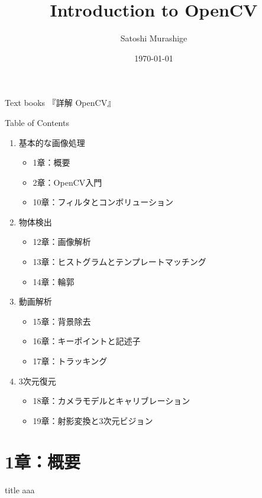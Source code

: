 \documentclass[10pt]{beamer}
\title{Introduction to OpenCV}
\date{\today}
\author{Satoshi Murashige}
\institute{Mathematical Informatics Lab., NAIST}
\newcommand{\myinsertlogo}[1]{%
\begin{tikzpicture}[overlay, remember picture]
    \node[above left=1cm and .8cm of current page.south east] {\texttt{[image: \#1]}};
\end{tikzpicture}}
\begin{document}
	\begin{frame}[plain]
		\maketitle
	\end{frame}
	\begin{frame}{Text books}
		『詳解 OpenCV』
	\end{frame}
	\begin{frame}{Table of Contents}
		\begin{enumerate}
			\item 基本的な画像処理
				\begin{itemize}
					\item 1章：概要
					\item 2章：OpenCV入門
					\item 10章：フィルタとコンボリューション
				\end{itemize}
			\item 物体検出
				\begin{itemize}
					\item 12章：画像解析
					\item 13章：ヒストグラムとテンプレートマッチング
					\item 14章：輪郭
				\end{itemize}
			\item 動画解析
				\begin{itemize}
					\item 15章：背景除去
					\item 16章：キーポイントと記述子
					\item 17章：トラッキング
				\end{itemize}
			\item 3次元復元
				\begin{itemize}
					\item 18章：カメラモデルとキャリブレーション
					\item 19章：射影変換と3次元ビジョン
				\end{itemize}
		\end{enumerate}
	\end{frame}

	\section{1章：概要}

	\begin{frame}{title}
		aaa
	\end{frame}
	
\end{document}
